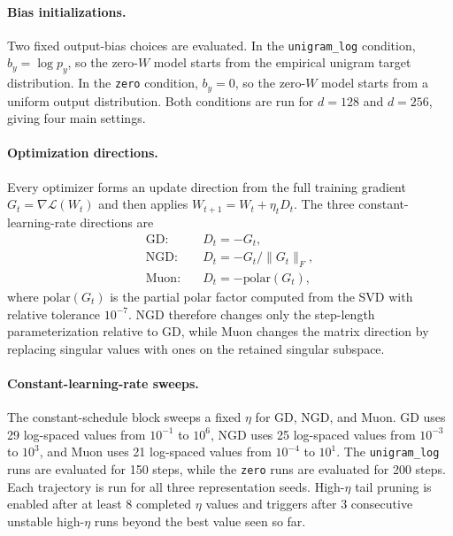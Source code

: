 \documentclass[11pt]{article}
\begin{document}
\paragraph{Bias initializations.}
Two fixed output-bias choices are evaluated. In the \texttt{unigram\_log} condition, \(b_y=\log p_y\), so the zero-\(W\) model starts from the empirical unigram target distribution. In the \texttt{zero} condition, \(b_y=0\), so the zero-\(W\) model starts from a uniform output distribution. Both conditions are run for \(d=128\) and \(d=256\), giving four main settings.

\paragraph{Optimization directions.}
Every optimizer forms an update direction from the full training gradient \(G_t=\nabla\mathcal{L}(W_t)\) and then applies \(W_{t+1}=W_t+\eta_t D_t\). The three constant-learning-rate directions are
\begin{align}
\text{GD:}\quad &D_t=-G_t,\\
\text{NGD:}\quad &D_t=-G_t/\lVert G_t\rVert_F,\\
\text{Muon:}\quad &D_t=-\mathrm{polar}(G_t),
\end{align}
where \(\mathrm{polar}(G_t)\) is the partial polar factor computed from the SVD with relative tolerance \(10^{-7}\). NGD therefore changes only the step-length parameterization relative to GD, while Muon changes the matrix direction by replacing singular values with ones on the retained singular subspace.

\paragraph{Constant-learning-rate sweeps.}
The constant-schedule block sweeps a fixed \(\eta\) for GD, NGD, and Muon. GD uses 29 log-spaced values from \(10^{-1}\) to \(10^6\), NGD uses 25 log-spaced values from \(10^{-3}\) to \(10^3\), and Muon uses 21 log-spaced values from \(10^{-4}\) to \(10^1\). The \texttt{unigram\_log} runs are evaluated for 150 steps, while the \texttt{zero} runs are evaluated for 200 steps. Each trajectory is run for all three representation seeds. High-\(\eta\) tail pruning is enabled after at least 8 completed \(\eta\) values and triggers after 3 consecutive unstable high-\(\eta\) runs beyond the best value seen so far.
\end{document}

